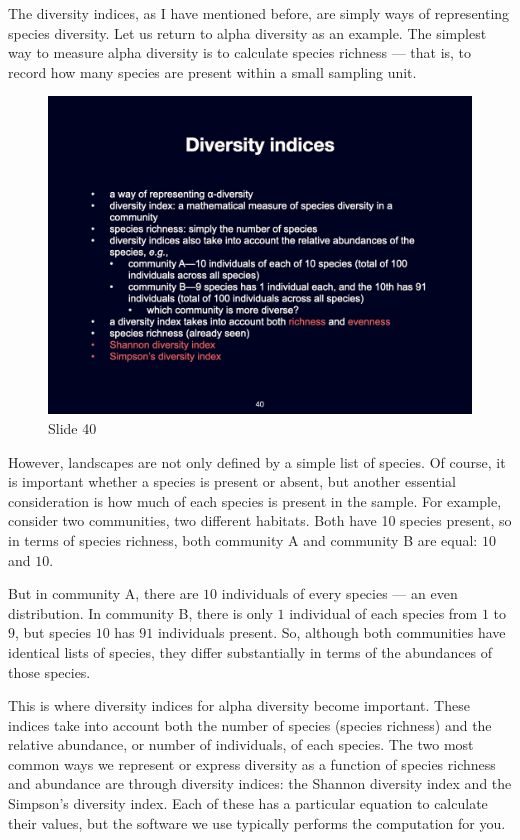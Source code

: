 \documentclass[
  12pt,
]{book}
\begin{document}
The diversity indices, as I have mentioned before, are simply ways of
representing species diversity. Let us return to alpha diversity as an
example. The simplest way to measure alpha diversity is to calculate
species richness --- that is, to record how many species are present
within a small sampling unit.

\begin{figure}[ht]
\centering
\includegraphics[width=0.8\linewidth]{../images/BDC334/BDC334-040.jpeg}
\caption*{Slide 40}
\end{figure}

However, landscapes are not only defined by a simple list of species. Of
course, it is important whether a species is present or absent, but
another essential consideration is how much of each species is present
in the sample. For example, consider two communities, two different
habitats. Both have 10 species present, so in terms of species richness,
both community A and community B are equal: \(10\) and \(10\).

But in community A, there are \(10\) individuals of every species --- an
even distribution. In community B, there is only \(1\) individual of
each species from \(1\) to \(9\), but species \(10\) has \(91\)
individuals present. So, although both communities have identical lists
of species, they differ substantially in terms of the abundances of
those species.

This is where diversity indices for alpha diversity become important.
These indices take into account both the number of species (species
richness) and the relative abundance, or number of individuals, of each
species. The two most common ways we represent or express diversity as a
function of species richness and abundance are through diversity
indices: the Shannon diversity index and the Simpson's diversity index.
Each of these has a particular equation to calculate their values, but
the software we use typically performs the computation for you.
\end{document}
